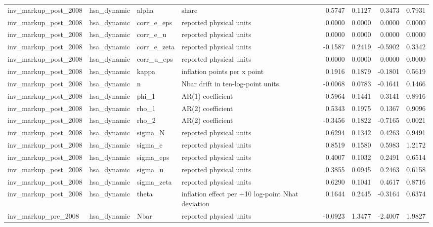 \begin{tabular}{llllrrrr}
inv\_markup\_post\_2008 & hsa\_dynamic & alpha & share & 0.5747 & 0.1127 & 0.3473 & 0.7931 \\
inv\_markup\_post\_2008 & hsa\_dynamic & corr\_e\_eps & reported physical units & 0.0000 & 0.0000 & 0.0000 & 0.0000 \\
inv\_markup\_post\_2008 & hsa\_dynamic & corr\_e\_u & reported physical units & 0.0000 & 0.0000 & 0.0000 & 0.0000 \\
inv\_markup\_post\_2008 & hsa\_dynamic & corr\_e\_zeta & reported physical units & -0.1587 & 0.2419 & -0.5902 & 0.3342 \\
inv\_markup\_post\_2008 & hsa\_dynamic & corr\_u\_eps & reported physical units & 0.0000 & 0.0000 & 0.0000 & 0.0000 \\
inv\_markup\_post\_2008 & hsa\_dynamic & kappa & inflation points per x point & 0.1916 & 0.1879 & -0.1801 & 0.5619 \\
inv\_markup\_post\_2008 & hsa\_dynamic & n & Nbar drift in ten-log-point units & -0.0068 & 0.0783 & -0.1641 & 0.1466 \\
inv\_markup\_post\_2008 & hsa\_dynamic & phi\_1 & AR(1) coefficient & 0.5964 & 0.1441 & 0.3141 & 0.8916 \\
inv\_markup\_post\_2008 & hsa\_dynamic & rho\_1 & AR(2) coefficient & 0.5343 & 0.1975 & 0.1367 & 0.9096 \\
inv\_markup\_post\_2008 & hsa\_dynamic & rho\_2 & AR(2) coefficient & -0.3456 & 0.1822 & -0.7165 & 0.0021 \\
inv\_markup\_post\_2008 & hsa\_dynamic & sigma\_N & reported physical units & 0.6294 & 0.1342 & 0.4263 & 0.9491 \\
inv\_markup\_post\_2008 & hsa\_dynamic & sigma\_e & reported physical units & 0.8519 & 0.1580 & 0.5983 & 1.2172 \\
inv\_markup\_post\_2008 & hsa\_dynamic & sigma\_eps & reported physical units & 0.4007 & 0.1032 & 0.2491 & 0.6514 \\
inv\_markup\_post\_2008 & hsa\_dynamic & sigma\_u & reported physical units & 0.3855 & 0.0945 & 0.2463 & 0.6158 \\
inv\_markup\_post\_2008 & hsa\_dynamic & sigma\_zeta & reported physical units & 0.6290 & 0.1041 & 0.4617 & 0.8716 \\
inv\_markup\_post\_2008 & hsa\_dynamic & theta & inflation effect per +10 log-point Nhat deviation & 0.1644 & 0.2445 & -0.3164 & 0.6374 \\
inv\_markup\_pre\_2008 & hsa\_dynamic & Nbar & reported physical units & -0.0923 & 1.3477 & -2.4007 & 1.9827 \\

\end{tabular}
